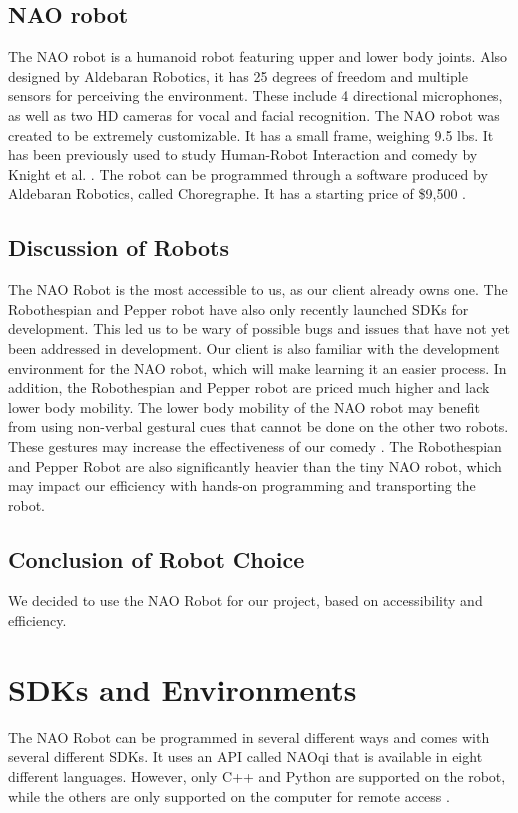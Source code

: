 \documentclass[onecolumn, draftclsnofoot,10pt, compsoc]{IEEEtran}
\begin{document}
\subsection{NAO robot}
The NAO robot is a humanoid robot featuring upper and lower body joints.
Also designed by Aldebaran Robotics, it has 25 degrees of freedom and multiple sensors for perceiving the environment.
These include 4 directional microphones, as well as two HD cameras for vocal and facial recognition.
The NAO robot was created to be extremely customizable.
It has a small frame, weighing 9.5 lbs.
It has been previously used to study Human-Robot Interaction and comedy by Knight et al. \cite{KnightSavvy:2011}.
The robot can be programmed through a software produced by Aldebaran Robotics, called Choregraphe.
It has a starting price of \$9,500 \cite{BuyNAO}. \cite{NAORobot}

\subsection{Discussion of Robots}
The NAO Robot is the most accessible to us, as our client already owns one.
The Robothespian and Pepper robot have also only recently launched SDKs for development.
This led us to be wary of possible bugs and issues that have not yet been addressed in development.
Our client is also familiar with the development environment for the NAO robot, which will make learning it an easier process.
In addition, the Robothespian and Pepper robot are priced much higher and lack lower body mobility.
The lower body mobility of the NAO robot may benefit from using non-verbal gestural cues that cannot be done on the other two robots.
These gestures may increase the effectiveness of our comedy \cite{KnightEightLessons:2011}.
The Robothespian and Pepper Robot are also significantly heavier than the tiny NAO robot, which may impact our efficiency with hands-on programming and transporting the robot.

\subsection{Conclusion of Robot Choice}
We decided to use the NAO Robot for our project, based on accessibility and efficiency.

\section{SDKs and Environments}
The NAO Robot can be programmed in several different ways and comes with several different SDKs. It uses an API called NAOqi that is available in eight different languages. However, only C++ and Python are supported on the robot, while the others are only supported on the computer for remote access \cite{NAOSDK:Overview}.
\end{document}
